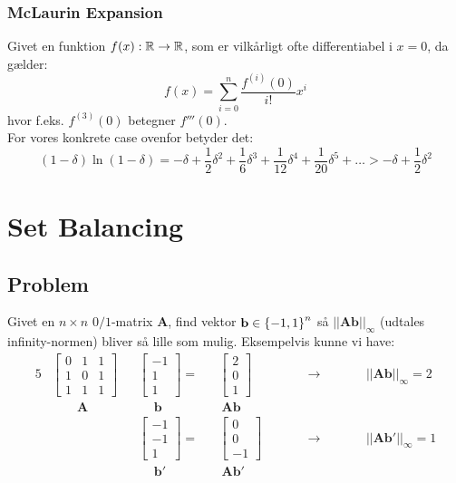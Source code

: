 \subsubsection{McLaurin Expansion}
Givet en funktion $f(x) : {\mathbb R} \to {\mathbb R}$, som er vilkårligt ofte differentiabel i $x = 0$, da gælder:
$$
f(x) = \sum_{i=0}^n \frac{f^{(i)} (0)}{i!} x^i
$$
hvor f.eks. $f^{(3)} (0)$ betegner $f'''(0)$.\\

For vores konkrete case ovenfor betyder det:
$$
(1 - \delta) \ln(1 - \delta)
= - \delta + \frac{1}{2} \delta^2 + \frac{1}{6} \delta^3 + \frac{1}{12} \delta^4 + \frac{1}{20} \delta^5 + \dots > - \delta + \frac{1}{2} \delta^2
$$






\section{Set Balancing}
\subsection{Problem}

Givet en $n \times n$ $0/1$-matrix $\mathbf A$, find vektor $\mathbf b \in \left\{ -1, 1 \right\}^n$ så $||\mathbf{Ab}||_\infty$ (udtales infinity-normen) bliver så lille som mulig. Eksempelvis kunne vi have:
\begin{alignat*}{5}
  &\begin{bmatrix}
  0 & 1 & 1\\
  1 & 0 & 1\\
  1 & 1 & 1
  \end{bmatrix}
  &&\begin{bmatrix}
  -1\\
  1\\
  1
  \end{bmatrix}
  =
  &&\begin{bmatrix}
  2\\
  0\\
  1
  \end{bmatrix}
  \quad\quad &&\rightarrow \quad\quad
  &&||\mathbf{Ab}||_\infty = 2\\
  &\quad\quad \mathbf A
  &&\quad \ \mathbf b
  && \ \mathbf{Ab}\\
  &
  &&\begin{bmatrix}
  -1\\
  -1\\
  1
  \end{bmatrix}
  =
  &&\begin{bmatrix}
  0\\
  0\\
  -1
  \end{bmatrix}
  \quad\quad &&\rightarrow \quad\quad
  &&||\mathbf{Ab'}||_\infty = 1\\
  &
  &&\quad \ \mathbf b'
  && \ \mathbf{Ab'}\\
\end{alignat*}

